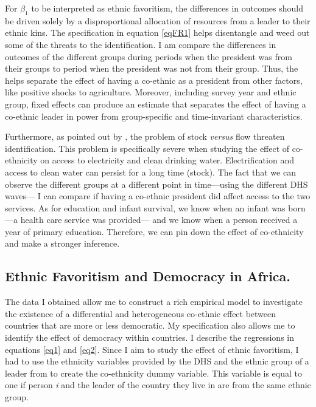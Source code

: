 \documentclass{wptemp}
\begin{document}
For $\beta_{1}$ to be interpreted as ethnic favoritism, the differences in outcomes should be driven solely by a disproportional allocation of resources from a leader to their ethnic kins. The specification in equation \ref{eqFR1} helps disentangle and weed out some of the threats to the identification. I am compare the differences in outcomes of the different groups during periods when the president was from their groups to period when the president was not from their group. Thus, the helps separate the effect of having a co-ethnic as a president from other factors, like positive shocks to agriculture. Moreover, including survey year and ethnic group, fixed effects can produce an estimate that separates the effect of having a co-ethnic leader in power from group-specific and time-invariant characteristics.

Furthermore, as pointed out by \citet{kramon2013benefits}, the problem of stock \textit{versus} flow threaten identification. This problem is specifically severe when studying the effect of co-ethnicity on access to electricity and clean drinking water. Electrification and access to clean water can persist for a long time (stock). The fact that we can observe the different groups at a different point in time---using the different DHS waves--- I can compare if having a co-ethnic president did affect access to the two services. As for education and infant survival, we know when an infant was born---a health care service was provided--- and we know when a person received a year of primary education. Therefore, we can pin down the effect of co-ethnicity and make a stronger inference.

\subsection{Ethnic Favoritism and Democracy in Africa.}
The data I obtained allow me to construct a rich empirical model to investigate the existence of a differential and heterogeneous co-ethnic effect between countries that are more or less democratic. My specification also allows me to identify the effect of democracy within countries. I describe the regressions in equations \ref{eq1} and \ref{eq2}. Since I aim to study the effect of ethnic favoritism, I had to use the ethnicity variables provided by the DHS and the ethnic group of a leader from \citet{fearon2007ethnic} to create the co-ethnicity dummy variable. This variable is equal to one if person \textit{i} and the leader of the country they live in are from the same ethnic group. 
\end{document}
